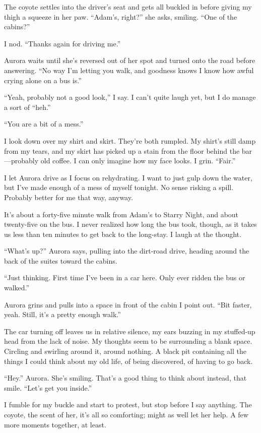 The coyote settles into the driver's seat and gets all buckled in before giving my thigh a squeeze in her paw. ``Adam's, right?'' she asks, smiling. ``One of the cabins?''

I nod. ``Thanks again for driving me.''

Aurora waits until she's reversed out of her spot and turned onto the road before answering. ``No way I'm letting you walk, and goodness knows I know how awful crying alone on a bus is.''

``Yeah, probably not a good look,'' I say. I can't quite laugh yet, but I do manage a sort of ``heh.''

``You are a bit of a mess.''

I look down over my shirt and skirt. They're both rumpled. My shirt's still damp from my tears, and my skirt has picked up a stain from the floor behind the bar---probably old coffee. I can only imagine how my face looks. I grin. ``Fair.''

I let Aurora drive as I focus on rehydrating. I want to just gulp down the water, but I've made enough of a mess of myself tonight. No sense risking a spill. Probably better for me that way, anyway.

It's about a forty-five minute walk from Adam's to Starry Night, and about twenty-five on the bus. I never realized how long the bus took, though, as it takes us less than ten minutes to get back to the long-stay. I laugh at the thought.

``What's up?'' Aurora says, pulling into the dirt-road drive, heading around the back of the suites toward the cabins.

``Just thinking. First time I've been in a car here. Only ever ridden the bus or walked.''

Aurora grins and pulls into a space in front of the cabin I point out. ``Bit faster, yeah. Still, it's a pretty enough walk.''

The car turning off leaves us in relative silence, my ears buzzing in my stuffed-up head from the lack of noise. My thoughts seem to be surrounding a blank space. Circling and swirling around it, around nothing. A black pit containing all the things I could think about my old life, of being discovered, of having to go back.

``Hey.'' Aurora. She's smiling. That's a good thing to think about instead, that smile. ``Let's get you inside.''

I fumble for my buckle and start to protest, but stop before I say anything. The coyote, the scent of her, it's all so comforting; might as well let her help. A few more moments together, at least.

